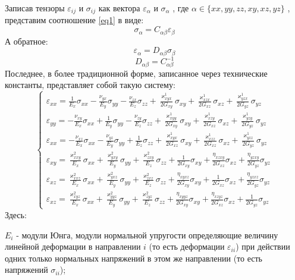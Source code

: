 Записав тензоры 
$\varepsilon_{ij}$ 
и 
$\sigma_{ij}$ 
как вектора 
$\varepsilon_{\alpha}$ 
и
$\sigma_{\alpha}$
, где 
$\alpha \in \{xx, yy, zz, xy, xz, yz\}$
, представим соотношение \ref{eq1} в виде:
$$
    \sigma_{\alpha} = C_{\alpha\beta}\varepsilon_{\beta}
$$
А обратное:
$$
    \varepsilon_{\alpha} = D_{\alpha\beta}\sigma_{\beta}
$$
$$
D_{\alpha\beta} = C^{-1}_{\alpha\beta}
$$
Последнее, в более традиционной форме, записанное через технические константы, представляет собой такую систему:
\begin{equation*}
    \begin{cases}
        \varepsilon_{xx} = \frac{1}{E_x}\sigma_{xx} - \frac{\nu_{yx}}{E_y}\sigma_{yy} - \frac{\nu_{zx}}{E_z}\sigma_{zz} + \frac{\varkappa^1_{xyx}}{2G_{xy}}\sigma_{xy} + \frac{\varkappa^1_{xzx}}{2G_{xz}}\sigma_{xz} + \frac{\varkappa^1_{yzx}}{2G_{yz}}\sigma_{yz}\\
        \varepsilon_{yy} = - \frac{\nu_{xy}}{E_x}\sigma_{xx} + \frac{1}{E_y}\sigma_{yy} - \frac{\nu_{zy}}{E_z}\sigma_{zz} + \frac{\varkappa^1_{xyy}}{2G_{xy}}\sigma_{xy} + \frac{\varkappa^1_{xzy}}{2G_{xz}}\sigma_{xz} + \frac{\varkappa^1_{yzy}}{2G_{yz}}\sigma_{yz}\\
        \varepsilon_{xx} = - \frac{\nu_{xz}}{E_x}\sigma_{xx} - \frac{\nu_{yz}}{E_y}\sigma_{yy} + \frac{1}{E_z}\sigma_{zz} + \frac{\varkappa^1_{xyx}}{2G_{xz}}\sigma_{xy} + \frac{\varkappa^1_{xzz}}{2G_{xz}}\sigma_{xz} + \frac{\varkappa^1_{yzz}}{2G_{yz}}\sigma_{yz}\\
        \varepsilon_{xy} = \frac{\varkappa^2_{xxy}}{E_x}\sigma_{xx} + \frac{\varkappa^2_{yxy}}{E_y}\sigma_{yy} + \frac{\varkappa^2_{zxy}}{E_z}\sigma_{zz} + \frac{1}{2G_{xy}}\sigma_{xy} + \frac{\eta_{xzxy}}{2G_{xz}}\sigma_{xz} + \frac{\eta_{yzxy}}{2G_{yz}}\sigma_{yz}\\
        \varepsilon_{xz} = \frac{\varkappa^2_{xxz}}{E_x}\sigma_{xx} + \frac{\varkappa^2_{yxz}}{E_y}\sigma_{yy} + \frac{\varkappa^2_{zxz}}{E_z}\sigma_{zz} + \frac{\eta_{xyxz}}{2G_{xy}}\sigma_{xy} + \frac{1}{2G_{xz}}\sigma_{xz} + \frac{\eta_{yzxz}}{2G_{yz}}\sigma_{yz}\\
        \varepsilon_{xz} = \frac{\varkappa^2_{xyz}}{E_x}\sigma_{xx} + \frac{\varkappa^2_{yyz}}{E_y}\sigma_{yy} + \frac{\varkappa^2_{zyz}}{E_z}\sigma_{zz} + \frac{\eta_{xyyz}}{2G_{xy}}\sigma_{xy} + \frac{\eta_{xzyz}}{2G_{xz}}\sigma_{xz} + \frac{1}{2G_{yz}}\sigma_{yz}
    \end{cases}
\end{equation*}
Здесь:

$E_i$ - модули Юнга, модули нормальной упругости определяющие величину линейной деформации в направлении 
$i$ (то есть деформации 
$\varepsilon_{ii}$)
при действии одних только нормальных напряжений в этом же направлении (то есть напряжений 
$\sigma_{ii}$);

